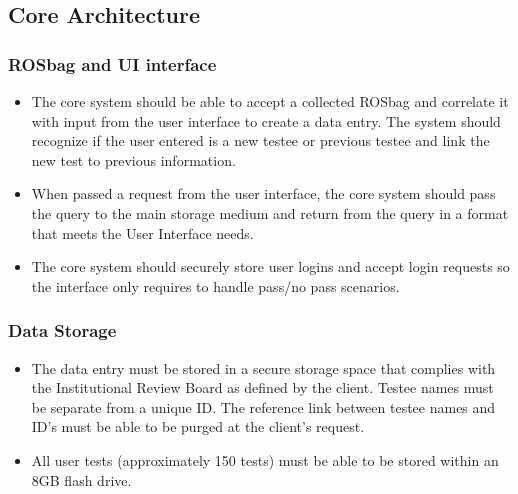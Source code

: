 \documentclass[onecolumn, draftclsnofoot,10pt, compsoc]{IEEEtran}
\begin{document}
\subsection{Core Architecture}
\subsubsection{ROSbag and UI interface}
\begin{itemize}
	\item The core system should be able to accept a collected ROSbag and correlate it with input from the user interface to create a data entry.
	\subitem The system should recognize if the user entered is a new testee or previous testee and link the new test to previous information.
	\item When passed a request from the user interface, the core system should pass the query to the main storage medium and return from the query in a format that meets the User Interface needs.
	\item The core system should securely store user logins and accept login requests so the interface only requires to handle pass/no pass scenarios.
\end{itemize}
\subsubsection{Data Storage}
\begin{itemize}
	\item The data entry must be stored in a secure storage space that complies with the Institutional Review Board as defined by the client.
	\subitem Testee names must be separate from a unique ID.
	\subitem The reference link between testee names and ID's must be able to be purged at the client's request.
	\item All user tests (approximately 150 tests) must be able to be stored within an 8GB flash drive.
\end{itemize}
\end{document}
